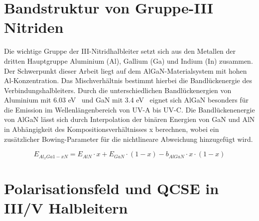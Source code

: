 

\thispagestyle{fancy}

\section{Bandstruktur von Gruppe-III Nitriden}



Die wichtige Gruppe der III-Nitridhalbleiter setzt sich aus den Metallen
der dritten Hauptgruppe Aluminium (Al), Gallium (Ga) und Indium (In) zusammen.
Der Schwerpunkt dieser Arbeit liegt auf dem AlGaN-Materialsystem mit hohen Al-Konzentration. Das Mischverhältnis bestimmt hierbei die Bandlückenergie des Verbindungshalbleiters. Durch die unterschiedlichen Bandlückenergien von Aluminium mit 6.03 eV~\cite{fenaln} und GaN mit 3.4 eV~\cite{pipr} eignet sich AlGaN besonders für die Emission im Wellenlängenbereich von UV-A bis UV-C. 
Die Bandlückenenergie von AlGaN lässt sich durch Interpolation der binären Energien von GaN und AlN in Abhängigkeit des Kompositionsverhältnisses x berechnen, wobei ein zusätzlicher Bowing-Parameter für die nichtlineare Abweichung hinzugefügt wird. 

\begin{equation}
    E_{Al_{x}Ga{1-x}N} = E_{AlN} \cdot x + E_{GaN} \cdot (1-x) - b_{AlGaN} \cdot x \cdot (1-x) 
\end{equation}


\newpage
\section{Polarisationsfeld und QCSE in III/V Halbleitern}

